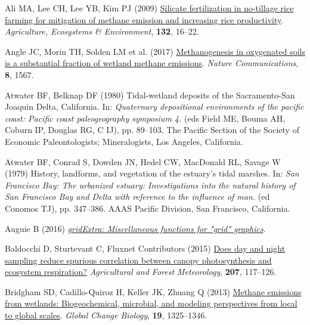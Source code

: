 \documentclass[
  12pt,
]{article}
\newlength{\cslhangindent}
\newenvironment{CSLReferences}[2] %
 {\begin{list}{}{%
  \setlength{\itemindent}{0pt}
  \setlength{\leftmargin}{0pt}
  \setlength{\parsep}{0pt}
  \ifodd #1
   \setlength{\leftmargin}{\cslhangindent}
   \setlength{\itemindent}{-1\cslhangindent}
  \fi
  \setlength{\itemsep}{#2\baselineskip}}}
 {\end{list}}
\begin{document}
\label{refs}
\begin{CSLReferences}{1}{0}
Ali MA, Lee CH, Lee YB, Kim PJ (2009)
\href{https://doi.org/10.1016/j.agee.2009.02.014}{Silicate fertilization
in no-tillage rice farming for mitigation of methane emission and
increasing rice productivity}. \emph{Agriculture, Ecosystems \&
Environment}, \textbf{132}, 16--22.

Angle JC, Morin TH, Solden LM et al. (2017)
\href{https://doi.org/10.1038/s41467-017-01753-4}{Methanogenesis in
oxygenated soils is a substantial fraction of wetland methane
emissions}. \emph{Nature Communications}, \textbf{8}, 1567.

Atwater BF, Belknap DF (1980) Tidal-wetland deposits of the
{Sacramento-San Joaquin Delta, California}. In: \emph{Quaternary
depositional environments of the pacific coast: Pacific coast
paleogeography symposium 4.} (eds Field ME, Bouma AH, Coburn IP, Douglas
RG, C IJ), pp. 89--103. The Pacific Section of the Society of Economic
Paleontologists; Mineralogists, Los Angeles, California.

Atwater BF, Conrad S, Dowden JN, Hedel CW, MacDonald RL, Savage W (1979)
History, landforms, and vegetation of the estuary's tidal marshes. In:
\emph{{San Francisco Bay}: The urbanized estuary: Investigations into
the natural history of {San Francisco Bay and Delta} with reference to
the influence of man.} (ed Conomos TJ), pp. 347--386. AAAS Pacific
Division, San Francisco, California.

Auguie B (2016)
\emph{\emph{\href{https://CRAN.R-project.org/package=gridExtra}{gridExtra:
Miscellaneous functions for "grid" graphics}}}.

Baldocchi D, Sturtevant C, Fluxnet Contributors (2015)
\href{https://doi.org/10.1016/j.agrformet.2015.03.010}{Does day and
night sampling reduce spurious correlation between canopy photosynthesis
and ecosystem respiration?} \emph{Agricultural and Forest Meteorology},
\textbf{207}, 117--126.

Bridgham SD, Cadillo-Quiroz H, Keller JK, Zhuang Q (2013)
\href{https://doi.org/10.1111/gcb.12131}{Methane emissions from
wetlands: Biogeochemical, microbial, and modeling perspectives from
local to global scales}. \emph{Global Change Biology}, \textbf{19},
1325--1346.


\end{CSLReferences}
\end{document}
